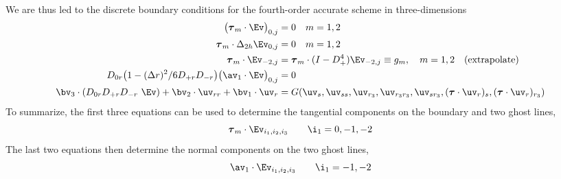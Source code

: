 \documentclass[10pt]{article}
\newcommand{\rc}{{r_3}}%
\begin{document}
We are thus led to the discrete boundary conditions for the fourth-order accurate scheme in three-dimensions
\begin{align}
    \big(\tauv_m\cdot\Ev\big)_{0,j}  &=0 \quad m=1,2 \\
 \tauv_m\cdot\Delta_{2h} \Ev_{0,j}  &=0 \quad m=1,2 \\
 \tauv_m\cdot\Ev_{-2,j} &= \tauv_m \cdot (I-D_+^4)\Ev_{-2,j} \equiv g_m , \quad m=1,2  \quad\mbox{(extrapolate)} \\
  D_{0r}\big(1- (\Delta r)^2/6 D_{+r}D_{-r}\big) \big(\av_1\cdot\Ev\big)_{0,j} &= 0 \\
  \bv_3\cdot(D_{0r}D_{+r}D_{-r}~\Ev) + \bv_2\cdot\uv_{rr} + \bv_1\cdot\uv_{r} 
                &= G(\uv_s,\uv_{ss},\uv_{\rc},\uv_{\rc\rc},\uv_{s\rc},(\tauv\cdot\uv_r)_s, (\tauv\cdot\uv_r)_\rc)
\end{align}
To summarize, the first three equations can be used to determine the tangential components
 on the boundary and two ghost lines,
\[
    \tauv_m\cdot\Ev_{i_1,i_2,i_3} \qquad \i_1=0,-1,-2
\]
The last two equations then determine the normal components on the two ghost lines,
\[
    \av_1\cdot\Ev_{i_1,i_2,i_3} \qquad \i_1=-1,-2
\]



\end{document}

